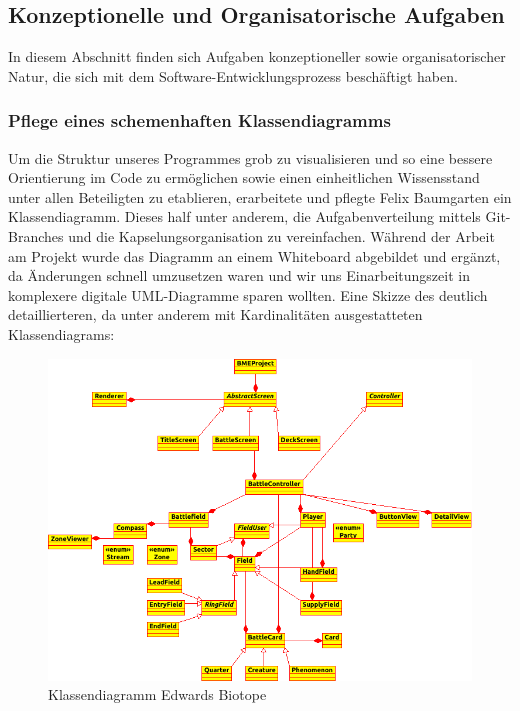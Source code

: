 \subsection{Konzeptionelle und Organisatorische Aufgaben}
In diesem Abschnitt finden sich Aufgaben konzeptioneller sowie organisatorischer Natur, die sich mit dem Software-Entwicklungsprozess beschäftigt haben.

\subsubsection{Pflege eines schemenhaften Klassendiagramms}
Um die Struktur unseres Programmes grob zu visualisieren und so eine bessere Orientierung im Code zu ermöglichen sowie einen einheitlichen Wissensstand unter allen Beteiligten zu etablieren, erarbeitete und pflegte Felix Baumgarten ein Klassendiagramm.
Dieses half unter anderem, die Aufgabenverteilung mittels Git-Branches und die Kapselungsorganisation zu vereinfachen. Während der Arbeit am Projekt wurde das Diagramm an einem Whiteboard abgebildet und ergänzt, da Änderungen schnell umzusetzen waren und wir uns Einarbeitungszeit in komplexere digitale UML-Diagramme sparen wollten.
Eine Skizze des deutlich detaillierteren, da unter anderem mit Kardinalitäten ausgestatteten Klassendiagrams:
\begin{figure}
\includegraphics[width=1\textwidth]{../img/klassendiagramm.PNG}
\caption{Klassendiagramm Edwards Biotope}
\label{fig:Klassendiagramm_Edwards_Biotope}
\end{figure}


